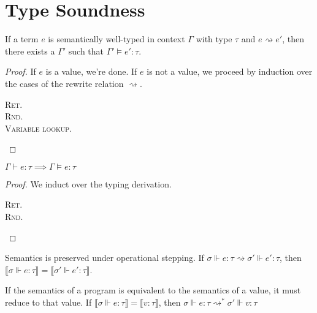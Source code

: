 \section{Type Soundness}
\begin{theorem}
If a term $e$ is semantically well-typed in context $\Gamma$ with type $\tau$ and $e \rightsquigarrow e'$, then there exists a $\Gamma'$ such that $\Gamma' \vDash e' : \tau$.
\end{theorem}
\begin{proof}
If $e$ is a value, we're done. 
If $e$ is not a value, we proceed by induction over the cases of the rewrite relation
$\rightsquigarrow$.
\begin{description}
  \item[\textsc{Ret.}]
  \item[\textsc{Rnd.}]
  \item[\textsc{Variable lookup.}]
\end{description}
\end{proof}

\begin{theorem}
$\Gamma \vdash e : \tau \implies \Gamma \vDash e : \tau$
\end{theorem}
\begin{proof}
We induct over the typing derivation.
\begin{description}
  \item[\textsc{Ret.}]
  \item[\textsc{Rnd.}]
\end{description}
\end{proof}


Semantics is preserved under operational stepping. If $\sigma \Vdash e : \tau \rightsquigarrow \sigma'
\Vdash e' : \tau$, then $\llbracket \sigma \Vdash e : \tau \rrbracket =
\llbracket \sigma' \Vdash e' : \tau \rrbracket$.

If the semantics of a program is equivalent to the semantics of a value, it must
reduce to that value. If $\llbracket \sigma \Vdash e : \tau \rrbracket =
\llbracket v : \tau \rrbracket$, then $\sigma \Vdash e : \tau
\rightsquigarrow^{*} \sigma' \Vdash v : \tau$

